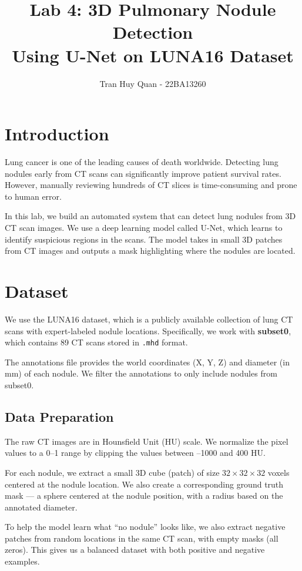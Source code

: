 \documentclass[conference]{IEEEtran}
\title{Lab 4: 3D Pulmonary Nodule Detection\\Using U-Net on LUNA16 Dataset}
\author{Tran Huy Quan - 22BA13260}
\begin{document}
\maketitle

\section{Introduction}

Lung cancer is one of the leading causes of death worldwide. Detecting lung nodules early from CT scans can significantly improve patient survival rates. However, manually reviewing hundreds of CT slices is time-consuming and prone to human error.

In this lab, we build an automated system that can detect lung nodules from 3D CT scan images. We use a deep learning model called U-Net, which learns to identify suspicious regions in the scans. The model takes in small 3D patches from CT images and outputs a mask highlighting where the nodules are located.

\section{Dataset}

We use the LUNA16 dataset, which is a publicly available collection of lung CT scans with expert-labeled nodule locations. Specifically, we work with \textbf{subset0}, which contains 89 CT scans stored in \texttt{.mhd} format.

The annotations file provides the world coordinates (X, Y, Z) and diameter (in mm) of each nodule. We filter the annotations to only include nodules from subset0.

\subsection{Data Preparation}

The raw CT images are in Hounsfield Unit (HU) scale. We normalize the pixel values to a 0--1 range by clipping the values between --1000 and 400 HU.

For each nodule, we extract a small 3D cube (patch) of size $32 \times 32 \times 32$ voxels centered at the nodule location. We also create a corresponding ground truth mask --- a sphere centered at the nodule position, with a radius based on the annotated diameter.

To help the model learn what ``no nodule'' looks like, we also extract negative patches from random locations in the same CT scan, with empty masks (all zeros). This gives us a balanced dataset with both positive and negative examples.
\end{document}
